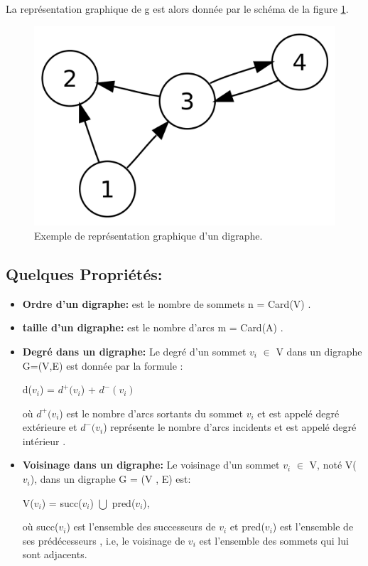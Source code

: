 		La représentation graphique de g est alors donnée par le schéma de la figure \ref{grapheOr}.
	
		
			\begin{figure}[h]
			\includegraphics[scale=0.15,center]{./ressources/image/RepDiGraphe.png}
			\caption[Exemple de représentation graphique d'un digraphe.]{Exemple de représentation graphique d'un digraphe.}
			\label{grapheOr}
			\end{figure}
			
		
		\subsection{Quelques Propriétés:} %
			\begin{itemize}[label=$\circ$]
			\item\textbf{Ordre d'un digraphe:}
			est le nombre de sommets n = Card(V) \citep{DUT}.
			
			\item\textbf{taille d'un digraphe:} est le nombre d’arcs m = Card(A) \citep{DUT}.
			
			\item\textbf{Degré dans un digraphe:}
			Le degré d'un sommet $v_{i}$ $\in$ V dans un digraphe G=(V,E) est donnée par la formule :
			\begin{center}
				d($v_{i}$) = $d^+(v_{i}$) + $d^-(v_{i})$\\
			\end{center}			 
			 où $d^+(v_{i}$) est le nombre d'arcs sortants du sommet $v_{i}$ et est appelé degré extérieure et $d^-(v_{i}$) représente le nombre d'arcs incidents et est appelé degré intérieur \citep{muller}.
			 
			 \item\textbf{Voisinage dans un digraphe:}
			 Le voisinage d'un sommet $v_{i}$ $\in$ V, noté V($v_{i}$), dans un digraphe G = (V , E) est:
			 	\begin{center}
				V($v_{i}$) = succ($v_{i}$) $\bigcup$ pred($v_{i}$),
				\end{center}
				
				où succ($v_{i}$) est l'ensemble des successeurs de $v_{i}$ et pred($v_{i}$) est l'ensemble de ses prédécesseurs \citep{bac}, i.e, le voisinage de $v_{i}$ est l'ensemble des sommets qui lui sont adjacents.
			
			\end{itemize}
			